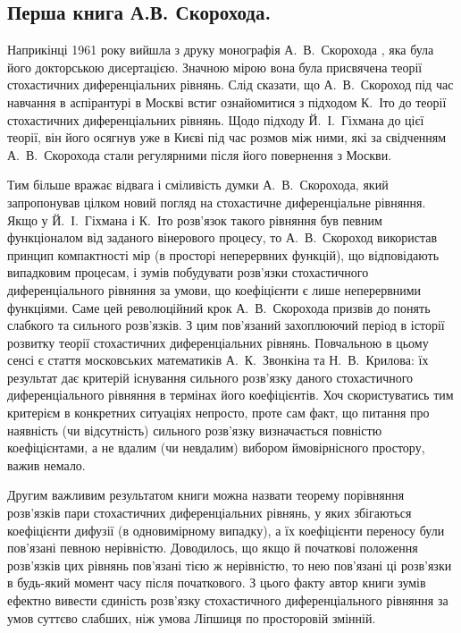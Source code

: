 \documentclass[11pt, reqno]{amsart}
\begin{document}
\subsection{Перша книга А.В. Скорохода.}
Наприкінці 1961 року вийшла з друку монографія А.~В.~Скорохода \cite{b9}, яка була його докторською дисертацією. Значною мірою вона була присвячена теорії стохастичних диференціальних рівнянь. Слід сказати, що А.~В.~Скороход під час навчання в аспірантурі в Москві встиг ознайомитися з підходом К.~Іто до теорії стохастичних диференціальних рівнянь. Щодо підходу Й.~І.~Гіхмана до цієї теорії, він його осягнув уже в Києві під час розмов між ними, які за свідченням А.~В.~Скорохода стали регулярними після його повернення з Москви.

Тим більше вражає відвага і сміливість думки А.~В.~Скорохода, який запропонував цілком новий погляд на стохастичне диференціальне рівняння. Якщо у Й.~І.~Гіхмана і К.~Іто розв’язок такого рівняння був певним функціоналом від заданого вінерового процесу, то А.~В.~Скороход використав принцип компактності мір (в просторі неперервних функцій), що  відповідають випадковим процесам, і зумів побудувати розв’язки стохастичного диференціального рівняння за умови, що коефіцієнти є лише неперервними функціями. Саме цей революційний крок  А.~В.~Скорохода призвів до понять слабкого та сильного розв’язків. З цим пов'язаний захоплюючий період в історії розвитку теорії стохастичних диференціальних рівнянь. Повчальною в цьому сенсі є стаття \cite{b10} московських математиків А.~К.~Звонкіна та Н.~В.~Крилова: їх результат дає критерій існування сильного розв’язку даного стохастичного диференціального   рівняння в термінах його коефіцієнтів. Хоч скористуватись тим критерієм в конкретних ситуаціях непросто, проте сам факт, що питання про наявність (чи відсутність) сильного розв’язку визначається повністю коефіцієнтами, а не вдалим  (чи невдалим) вибором ймовірнісного простору, важив немало.

Другим важливим результатом книги можна назвати теорему порівняння розв’язків пари стохастичних диференціальних рівнянь, у яких збігаються коефіцієнти дифузії (в одновимірному випадку), а їх коефіцієнти переносу були пов’язані певною нерівністю. Доводилось, що якщо й початкові положення розв'язків цих рівнянь пов'язані тією ж нерівністю, то нею пов'язані ці розв'язки в будь-який момент часу після початкового. З цього факту автор книги зумів ефектно вивести єдиність розв'язку стохастичного диференціального рівняння за умов суттєво слабших, ніж умова Ліпшиця по просторовій змінній.
\end{document}
